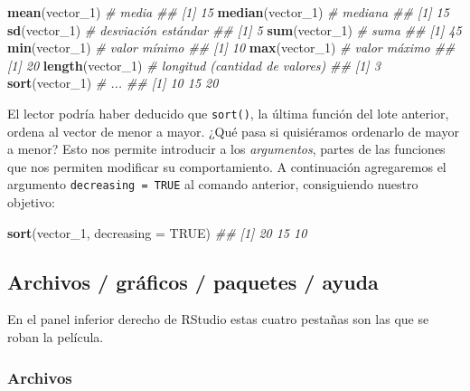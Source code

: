 \documentclass[]{book}
\newenvironment{Shaded}{\begin{snugshade}}{\end{snugshade}}
\newcommand{\CommentTok}[1]{\textcolor[rgb]{0.56,0.35,0.01}{\textit{#1}}}
\newcommand{\DataTypeTok}[1]{\textcolor[rgb]{0.13,0.29,0.53}{#1}}
\newcommand{\DecValTok}[1]{\textcolor[rgb]{0.00,0.00,0.81}{#1}}
\newcommand{\KeywordTok}[1]{\textcolor[rgb]{0.13,0.29,0.53}{\textbf{#1}}}
\newcommand{\NormalTok}[1]{#1}
\newcommand{\OtherTok}[1]{\textcolor[rgb]{0.56,0.35,0.01}{#1}}
\begin{document}
\begin{Shaded}
\begin{Highlighting}[]
\KeywordTok{mean}\NormalTok{(vector_}\DecValTok{1}\NormalTok{) }\CommentTok{# media}
\CommentTok{## [1] 15}
\KeywordTok{median}\NormalTok{(vector_}\DecValTok{1}\NormalTok{) }\CommentTok{# mediana}
\CommentTok{## [1] 15}
\KeywordTok{sd}\NormalTok{(vector_}\DecValTok{1}\NormalTok{) }\CommentTok{# desviación estándar}
\CommentTok{## [1] 5}
\KeywordTok{sum}\NormalTok{(vector_}\DecValTok{1}\NormalTok{) }\CommentTok{# suma}
\CommentTok{## [1] 45}
\KeywordTok{min}\NormalTok{(vector_}\DecValTok{1}\NormalTok{) }\CommentTok{# valor mínimo}
\CommentTok{## [1] 10}
\KeywordTok{max}\NormalTok{(vector_}\DecValTok{1}\NormalTok{) }\CommentTok{# valor máximo}
\CommentTok{## [1] 20}
\KeywordTok{length}\NormalTok{(vector_}\DecValTok{1}\NormalTok{) }\CommentTok{# longitud (cantidad de valores)}
\CommentTok{## [1] 3}
\KeywordTok{sort}\NormalTok{(vector_}\DecValTok{1}\NormalTok{) }\CommentTok{# ...}
\CommentTok{## [1] 10 15 20}
\end{Highlighting}
\end{Shaded}

El lector podría haber deducido que \texttt{sort()}, la última función
del lote anterior, ordena al vector de menor a mayor. ¿Qué pasa si
quisiéramos ordenarlo de mayor a menor? Esto nos permite introducir a
los \emph{argumentos}, partes de las funciones que nos permiten
modificar su comportamiento. A continuación agregaremos el argumento
\texttt{decreasing\ =\ TRUE} al comando anterior, consiguiendo nuestro
objetivo:

\begin{Shaded}
\begin{Highlighting}[]
\KeywordTok{sort}\NormalTok{(vector_}\DecValTok{1}\NormalTok{, }\DataTypeTok{decreasing =} \OtherTok{TRUE}\NormalTok{)}
\CommentTok{## [1] 20 15 10}
\end{Highlighting}
\end{Shaded}

\hypertarget{archivos-graficos-paquetes-ayuda}{%
\subsection{Archivos / gráficos / paquetes /
ayuda}\label{archivos-graficos-paquetes-ayuda}}

En el panel inferior derecho de RStudio estas cuatro pestañas son las
que se roban la película.

\hypertarget{archivos}{%
\subsubsection{Archivos}\label{archivos}}
\end{document}
